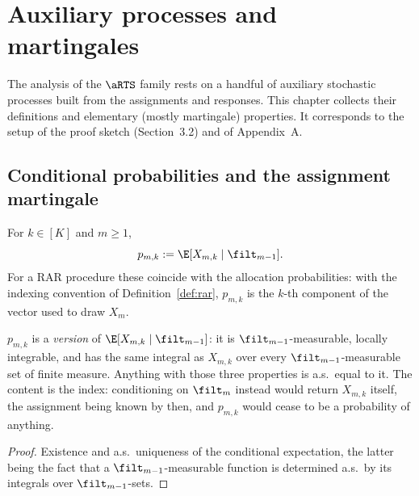 
\chapter{Auxiliary processes and martingales}
\label{chap:auxiliary}

The analysis of the $\aRTS$ family rests on a handful of auxiliary stochastic
processes built from the assignments and responses. This chapter collects their
definitions and elementary (mostly martingale) properties. It corresponds to the
setup of the proof sketch (Section~3.2) and of Appendix~A.

\section{Conditional probabilities and the assignment martingale}
\label{sec:aux_assignment}

\begin{definition}\label{def:cond_prob}
\leanok
{}
For $k \in [K]$ and $m \ge 1$,
\[
  p_{m,k} := \E[X_{m,k} \mid \filt_{m-1}].
\]
For a RAR procedure these coincide with the allocation probabilities: with the
indexing convention of Definition~\ref{def:rar}, $p_{m,k}$ is the $k$-th
component of the vector used to draw $X_m$.
\end{definition}

\begin{lemma}\label{lem:cond_prob_unique}
\leanok
{}
$p_{m,k}$ is a \emph{version} of $\E[X_{m,k}\mid\filt_{m-1}]$: it is $\filt_{m-1}$-measurable,
locally integrable, and has the same integral as $X_{m,k}$ over every $\filt_{m-1}$-measurable set
of finite measure. Anything with those three properties is a.s.\ equal to it. The content is the
index: conditioning on $\filt_m$ instead would return $X_{m,k}$ itself, the assignment being known
by then, and $p_{m,k}$ would cease to be a probability of anything.
\end{lemma}

\begin{proof}\leanok
Existence and a.s.\ uniqueness of the conditional expectation, the latter being the fact that a
$\filt_{m-1}$-measurable function is determined a.s.\ by its integrals over $\filt_{m-1}$-sets.
\end{proof}

